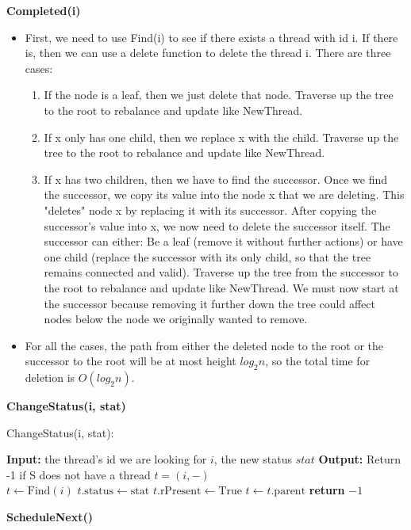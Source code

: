 \documentclass[11pt, a4paper]{article}
\begin{document}
\textbf{Completed(i)} \\
\begin{itemize}
    \item First, we need to use Find(i) to see if there exists a thread with id i. If there is, then we can use a delete function to delete the thread i. There are three cases:
    \begin{enumerate}
    \item If the node is a leaf, then we just delete that node. Traverse up the tree to the root to rebalance and update like NewThread.
    \item If x only has one child, then we replace x with the child. Traverse up the tree to the root to rebalance and update like NewThread.
    \item If x has two children, then we have to find the successor. Once we find the successor, we copy its value into the node x that we are deleting. This "deletes" node x by replacing it with its successor. After copying the successor’s value into x, we now need to delete the successor itself. The successor can either: Be a leaf (remove it without further actions) or have one child (replace the successor with its only child, so that the tree remains connected and valid). Traverse up the tree from the successor to the root to rebalance and update like NewThread. We must now start at the successor because removing it further down the tree could affect nodes below the node we originally wanted to remove.
    \end{enumerate}
    \item For all the cases, the path from either the deleted node to the root or the successor to the root will be at most height $log_2n$, so the total time for deletion is $O(log_2n)$.
\end{itemize}
\textbf{ChangeStatus(i, stat)}

\begin{algorithm} [H]
\caption{ChangeStatus(i, stat):}
\begin{algorithmic}[1]
\State \textbf{Input:} the thread's id we are looking for \( i \), the new status \( stat \)
\State \textbf{Output:} Return -1 if S does not have a thread $t = (i, -)$
\\
    \State $t \gets \text{Find}(i)$
        \State $t.\text{status} \gets \text{stat}$
                \State $t.\text{rPresent} \gets \text{True}$
            \EndIf
            \State $t \gets t.\text{parent}$
        \EndWhile
    \Else
        \State \textbf{return} $-1$
    \EndIf

\end{algorithmic}
\end{algorithm}
\textbf{ScheduleNext()}
\end{document}
